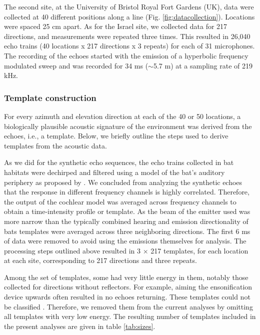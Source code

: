 \documentclass[preprint,5p]{elsarticle}
\begin{document}
The second site, at the University of Bristol Royal Fort Gardens (UK), data were collected at 40 different positions along a line (Fig. \ref{fig:datacollection}). Locations were spaced 25 cm apart. As for the Israel site, we collected data for 217 directions, and measurements were repeated three times. This resulted in 26,040 echo trains (40 locations x 217 directions x 3 repeats) for each of 31 microphones. The recording of the echoes started with the emission of a hyperbolic frequency modulated sweep and was recorded for 34 ms ($\sim$5.7 m) at a sampling rate of 219 kHz. 

\subsubsection{Template construction}

For every azimuth and elevation direction at each of the  40 or 50 locations, a biologically plausible acoustic signature of the environment was derived from the echoes, i.e., a template. Below, we briefly outline the steps used to derive templates from the acoustic data.

As we did for the synthetic echo sequences, the echo trains collected in bat habitats were dechirped and filtered using a model of the bat's auditory periphery as proposed by \citet{Wiegrebe2008}. We concluded from analyzing the synthetic echoes that the response in different frequency channels is highly correlated. Therefore, the output of the cochlear model was averaged across frequency channels to obtain a time-intensity profile or template. As the beam of the emitter used was more narrow than the typically combined hearing and emission directionality of bats \citep{Vanderelst2010a,Reijniers2010,Jakobsen2012} templates were averaged across three neighboring directions. The first 6 ms of data were removed to avoid using the emissions themselves for analysis. The processing steps outlined above resulted in 3 $\times$ 217 templates, for each location at each site, corresponding to 217 directions and three repeats.

Among the set of templates, some had very little energy in them, notably those collected for directions without reflectors. For example, aiming the ensonification device upwards often resulted in no echoes returning. These templates could not be classified \citep{Vanderelst2016}. Therefore, we removed them from the current analyses by omitting all templates with very low energy. The resulting number of templates included in the present analyses are given in table \ref{tab:sizes}.
\end{document}
